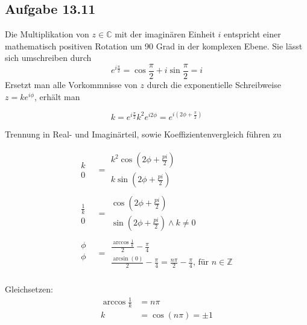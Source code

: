 \documentclass{standalone}
\begin{document}
\subsection{Aufgabe 13.11}
Die Multiplikation von $z \in \mathbb{C}$ mit der imaginären Einheit $i$ entspricht einer mathematisch positiven Rotation um 90 Grad in der komplexen Ebene.
Sie lässt sich umschreiben durch
$$ e^{i \frac{\pi}{2}} = \cos \frac{\pi}{2} + i \sin \frac{\pi}{2} = i $$
Ersetzt man alle Vorkommnisse von $z$ durch die exponentielle Schreibweise $z = k e^{i \phi}$, erhält man

$$ k = e^{i \frac{\pi}{2}} k^2e^{i 2 \phi} = e^{i (2 \phi + \frac{\pi}{2})} $$

Trennung in Real- und Imaginärteil, sowie Koeffizientenvergleich führen zu 

\begin{align}
    \begin{matrix} 
        k \\
        0
    \end{matrix}
    &=
    \begin{matrix} 
        k^2 \cos (2 \phi + \frac{pi}{2}) \\
        k \sin (2 \phi + \frac{pi}{2})
    \end{matrix} \\
    \begin{matrix} 
        \frac{1}{k} \\
        0
    \end{matrix}
    &=
    \begin{matrix} 
        \cos (2 \phi + \frac{pi}{2}) \\
        \sin (2 \phi + \frac{pi}{2}) \wedge k \neq 0
    \end{matrix} \\
    \begin{matrix} 
        \phi \\
        \phi \\
    \end{matrix}
    &=
    \begin{matrix} 
        \frac{\arccos \frac{1}{k}}{2} - \frac{\pi}{4} \\
        \frac{\arcsin (0)}{2} -\frac{\pi}{4} = \frac{n\pi}{2} -\frac{\pi}{4} \text{, für } n \in \mathbb{Z}
    \end{matrix} \\    
\end{align}

Gleichsetzen:
\begin{align}
    \arccos \frac{1}{k} &= n\pi \\
    k &= \cos (n\pi) = \pm 1
\end{align}
\end{document}
